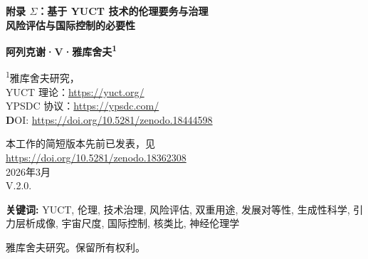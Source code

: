 \documentclass[12pt,a4paper]{article}
\theoremstyle{remark}
\begin{document}
	
	\begin{titlepage}
		\begin{center}
			\vspace*{1cm}
			
			\Huge\textbf{附录 $\Sigma$：基于 YUCT 技术的伦理要务与治理} \\
			\vspace{0.5cm}
			\Large\textbf{风险评估与国际控制的必要性}
			
			\vspace{1.5cm}
			
			\Large\textbf{阿列克谢·V·雅库舍夫\textsuperscript{1}}
			
			\vspace{0.3cm}
			\large
			\textsuperscript{1}雅库舍夫研究， \\ 
			YUCT 理论：\url{https://yuct.org/}\\
			YPSDC 协议：\url{https://ypsdc.com/}\\
			
			\vspace{2cm}
			\textbf DOI: \url{https://doi.org/10.5281/zenodo.18444598}\\
			
			\vspace{1cm}
			
			\vspace{0cm}
			\large 
			本工作的简短版本先前已发表，见\\ \url{https://doi.org/10.5281/zenodo.18362308}\\
			\vspace{1cm}
			2026年3月 \\ \large V.2.0.
			
			\vspace{1cm}
			\newpage
			\begin{minipage}{0.9\textwidth}
				\begin{abstract}
					\noindent
					雅库舍夫统一协调理论 (YUCT) 提供了一个统一物理学、化学、生物学和社会科学的数学框架。其实际应用——从精密化学和地球物理勘探到经济预测和认知增强——既带来前所未有的益处，也蕴含巨大的危害潜力。本附录系统地审视了与 YUCT 衍生关键技术相关的风险，以及该理论催生的新兴生成性科学学科。我们认为，这些工具的强大力量要求建立一种新的全球治理水平，这种治理不是基于禁令，而是基于控制、发展对等性和应用边界的有意扩展。借鉴核不扩散的成功先例，我们提出一个多层次的国际架构，包括框架条约、核查机构、出口管制制度和具有约束力的联合国安理会决议。特别关注规模效应——从行星到宇宙尺度——以及预防性伦理反思的必要性。
				\end{abstract}
			\end{minipage}
			
			\vspace{1cm}
			
			\noindent
			\small\textbf{关键词:} YUCT, 伦理, 技术治理, 风险评估, 双重用途, 发展对等性, 生成性科学, 引力层析成像, 宇宙尺度, 国际控制, 核类比, 神经伦理学
			
			\vspace{0.5cm}
			
			\noindent
			 雅库舍夫研究。保留所有权利。
		\end{center}
	\end{titlepage}
	
\end{document}
